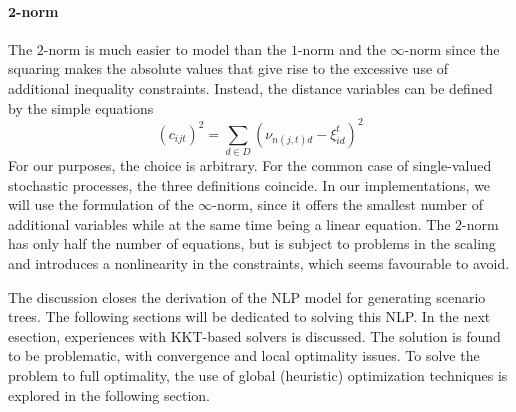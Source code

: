\documentclass[a4paper, 12pt] {article}
\begin{document}
\paragraph{$\mathbf{2}$-norm} The $2$-norm is much easier to model than the $1$-norm and the $\infty$-norm since the squaring makes the absolute values that give rise to the excessive use of additional inequality constraints. Instead, the distance variables can be defined by the simple equations
\begin{equation}
  \label{eq:c-as-2norm}
  \left(c_{ijt} \right)^2 = \sum_{d \in D}\left( \nu_{n(j,t)d} - \xi_{id}^t \right)^2
\end{equation}
For our purposes, the choice is arbitrary. For the common case of single-valued stochastic processes, the three definitions coincide. In our implementations, we will use the formulation of the $\infty$-norm, since it offers the smallest number of additional variables while at the same time being a linear equation. The $2$-norm has only half the number of equations, but is subject to problems in the scaling and introduces a nonlinearity in the constraints, which seems favourable to avoid.

The discussion closes the derivation of the NLP model for generating scenario trees. The following sections will be dedicated to solving this NLP. In the next esection, experiences with KKT-based solvers is discussed. The solution is found to be problematic, with convergence and local optimality issues. To solve the problem to full optimality, the use of global (heuristic) optimization techniques is explored in the following section.
\end{document}
